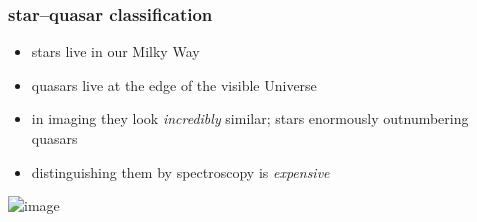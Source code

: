 \documentclass[pdftex]{beamer}
\begin{document}
\begin{frame}
  \frametitle{star--quasar classification}
  \begin{itemize}
  \item stars live in our Milky Way
  \item quasars live at the edge of the visible Universe
  \item in imaging they look \emph{incredibly} similar; stars enormously outnumbering quasars
  \item distinguishing them by spectroscopy is \emph{expensive}
  \end{itemize}
\end{frame}

\begin{frame}
\includegraphics<1>[height=\textheight]{../engineering/xdqso.png}
\end{frame}

\end{document}
